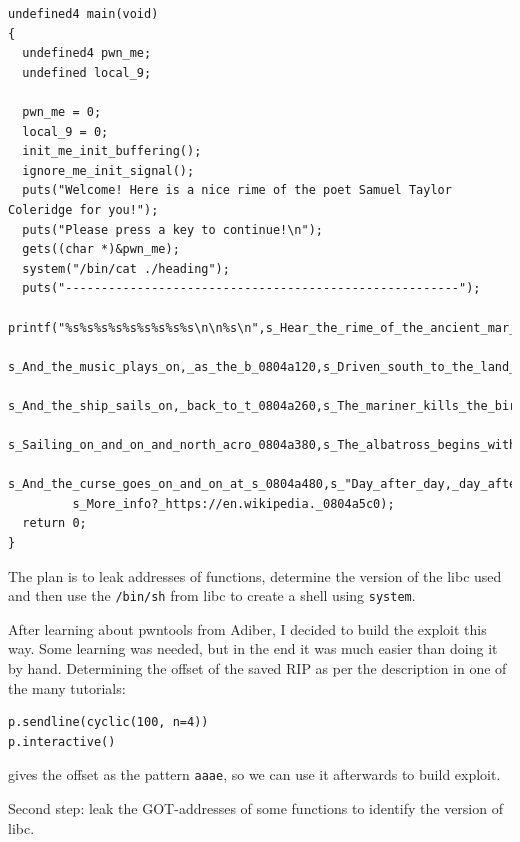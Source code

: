 \documentclass[english,a4paper,nols,noindent]{tufte-handout}
\begin{document}
\begin{verbatim}
undefined4 main(void)
{
  undefined4 pwn_me;
  undefined local_9;
  
  pwn_me = 0;
  local_9 = 0;
  init_me_init_buffering();
  ignore_me_init_signal();
  puts("Welcome! Here is a nice rime of the poet Samuel Taylor Coleridge for you!");
  puts("Please press a key to continue!\n");
  gets((char *)&pwn_me);
  system("/bin/cat ./heading");
  puts("-------------------------------------------------------");
  printf("%s%s%s%s%s%s%s%s%s\n\n%s\n",s_Hear_the_rime_of_the_ancient_mar_0804a060,
         s_And_the_music_plays_on,_as_the_b_0804a120,s_Driven_south_to_the_land_of_the_s_0804a1a0,
         s_And_the_ship_sails_on,_back_to_t_0804a260,s_The_mariner_kills_the_bird_of_go_0804a2c0,
         s_Sailing_on_and_on_and_north_acro_0804a380,s_The_albatross_begins_with_its_ve_0804a3e0,
         s_And_the_curse_goes_on_and_on_at_s_0804a480,s_"Day_after_day,_day_after_day_We_0804a4e0,
         s_More_info?_https://en.wikipedia._0804a5c0);
  return 0;
}
\end{verbatim}

The plan is to leak addresses of functions, determine the version of the libc
used and then use the \verb+/bin/sh+ from libc to create a shell using
\verb+system+.

After learning about pwntools from Adiber, I decided to build the exploit this
way.  Some learning was needed, but in the end it was much easier than doing it
by hand.  Determining the offset of the saved RIP as per the description in one
of the many tutorials:

\begin{verbatim}
p.sendline(cyclic(100, n=4))
p.interactive()
\end{verbatim}

gives the offset as the pattern \verb+aaae+, so we can use it afterwards to
build exploit.

Second step: leak the GOT-addresses of some functions to identify the version of libc.
\end{document}
